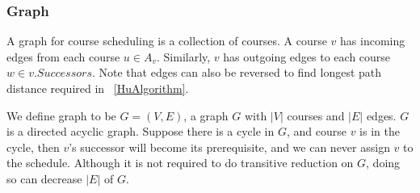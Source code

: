 \documentclass[letterpaper,12pt]{article}
\theoremstyle{definition}
\begin{document}
\subsubsection{Graph}
A graph for course scheduling is a collection of courses. A course $v$ has incoming edges from each course $u\in A_v$. Similarly, $v$ has outgoing edges to each course $w\in v.Successors$. Note  that edges can also be reversed to find longest path distance required in ~\ref{HuAlgorithm}. 

We define graph to be $G=(V,E)$, a graph $G$ with $|V|$ courses and $|E|$ edges. $G$ is a directed acyclic graph. Suppose there is a cycle in $G$, and course $v$ is in the cycle, then $v$'s successor will become its prerequisite, and we can never assign $v$ to the schedule. Although it is not required to do transitive reduction on $G$, doing so can decrease $|E|$ of $G$. 











\end{document}
